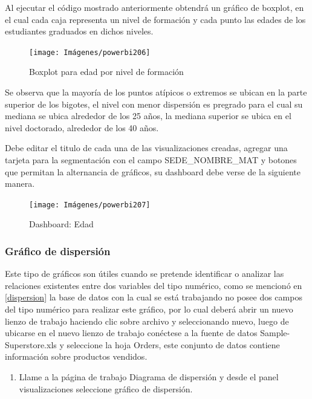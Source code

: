 \documentclass[
]{book}
\providecommand{\tightlist}{%
  \setlength{\itemsep}{0pt}\setlength{\parskip}{0pt}}
\begin{document}
Al ejecutar el código mostrado anteriormente obtendrá un gráfico de boxplot, en el cual cada caja representa un nivel de formación y cada punto las edades de los estudiantes graduados en dichos niveles.

\begin{figure}

{\centering \texttt{[image: Imágenes/powerbi206]} 

}

\caption{Boxplot para edad por nivel de formación}\label{fig:boxplotpowerbi-fig}
\end{figure}

Se observa que la mayoría de los puntos atípicos o extremos se ubican en la parte superior de los bigotes, el nivel con menor dispersión es pregrado para el cual su mediana se ubica alrededor de los 25 años, la mediana superior se ubica en el nivel doctorado, alrededor de los 40 años.

Debe editar el titulo de cada una de las visualizaciones creadas, agregar una tarjeta para la segmentación con el campo SEDE\_NOMBRE\_MAT y botones que permitan la alternancia de gráficos, su dashboard debe verse de la siguiente manera.

\begin{figure}

{\centering \texttt{[image: Imágenes/powerbi207]} 

}

\caption{Dashboard: Edad}\label{fig:tableroedad-fig}
\end{figure}

\hypertarget{gruxe1fico-de-dispersiuxf3n}{%
\subsubsection{Gráfico de dispersión}\label{gruxe1fico-de-dispersiuxf3n}}

Este tipo de gráficos son útiles cuando se pretende identificar o analizar las relaciones existentes entre dos variables del tipo numérico, como se mencionó en \ref{dispersion} la base de datos con la cual se está trabajando no posee dos campos del tipo numérico para realizar este gráfico, por lo cual deberá abrir un nuevo lienzo de trabajo haciendo clic sobre archivo y seleccionando nuevo, luego de ubicarse en el nuevo lienzo de trabajo conéctese a la fuente de datos Sample-Superstore.xls y seleccione la hoja Orders, este conjunto de datos contiene información sobre productos vendidos.

\begin{enumerate}
\def\labelenumi{\arabic{enumi}.}
\tightlist
\item
  Llame a la página de trabajo Diagrama de dispersión y desde el panel visualizaciones seleccione gráfico de dispersión.
\end{enumerate}
\end{document}

